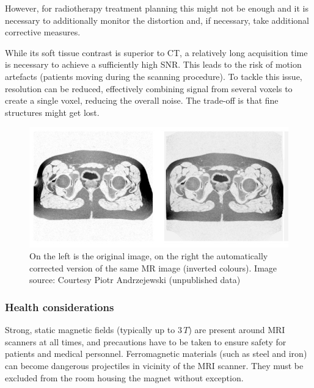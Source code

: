 However, for radiotherapy treatment planning this might not be enough and it is necessary to additionally monitor the distortion and, if necessary, take additional corrective measures. 

While its soft tissue contrast is superior to CT, a relatively long acquisition time is necessary to achieve a sufficiently high SNR.
This leads to the risk of motion artefacts (patients moving during the scanning procedure).
To tackle this issue, resolution can be reduced, effectively combining signal from several voxels to create a single voxel, reducing the overall noise.
The trade-off is that fine structures might get lost.

\begin{figure}[h!]
\centering
\includegraphics[width=\linewidth]{../fig/vgl-corr_inverse.jpg}
\caption[MR image before and after applying build-in distortion correction. Image source: Courtesy Piotr Andrzejewski (unpublished data)]{On the left is the original image, on the right the automatically corrected version of the same MR image (inverted colours). Image source: Courtesy Piotr Andrzejewski (unpublished data)}
\label{fig:dist_compare}
\end{figure}



\subsubsection{Health considerations}

Strong, static magnetic fields (typically up to $3\, T$) are present around MRI scanners at all times, and precautions have to be taken to ensure safety for patients and medical personnel.
Ferromagnetic materials (such as steel and iron) can become dangerous projectiles in vicinity of the MRI scanner.
They must be excluded from the room housing the magnet without exception.\\

